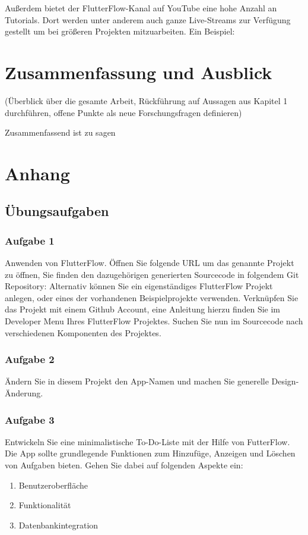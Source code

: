 \documentclass[acmtog, language=ngerman]{acmart}
\begin{document}
Außerdem bietet der FlutterFlow-Kanal auf YouTube eine hohe Anzahl an Tutorials. Dort werden unter anderem auch ganze Live-Streams zur Verfügung gestellt um bei größeren Projekten mitzuarbeiten. Ein Beispiel: \cite{flutterflow_youtube}


\section{Zusammenfassung und Ausblick}

(Überblick über die gesamte Arbeit, Rückführung auf Aussagen aus Kapitel 1 durchführen, offene Punkte als neue Forschungsfragen definieren)

Zusammenfassend ist zu sagen





\appendix

\section{Anhang}

\subsection{Übungsaufgaben}
\subsubsection{Aufgabe 1}
Anwenden von FlutterFlow. Öffnen Sie folgende URL um das genannte Projekt zu öffnen, Sie finden den dazugehörigen generierten Sourcecode in folgendem Git Repository: 
Alternativ können Sie ein eigenständiges FlutterFlow Projekt anlegen, oder eines der vorhandenen Beispielprojekte verwenden. Verknüpfen Sie das Projekt mit einem Github Account, eine Anleitung hierzu finden Sie im Developer Menu Ihres FlutterFlow Projektes. 
Suchen Sie nun im Sourcecode nach verschiedenen Komponenten des Projektes.

\subsubsection{Aufgabe 2}
Ändern Sie in diesem Projekt den App-Namen und machen Sie generelle Design-Änderung.

\subsubsection{Aufgabe 3}
Entwickeln Sie eine minimalistische To-Do-Liste mit der Hilfe von FutterFlow. Die App sollte grundlegende Funktionen zum Hinzufüge, Anzeigen und Löschen von Aufgaben bieten.
Gehen Sie dabei auf folgenden Aspekte ein:
\begin{enumerate}
    \item Benutzeroberfläche
    \item Funktionalität
    \item Datenbankintegration
\end{enumerate}
\end{document}
